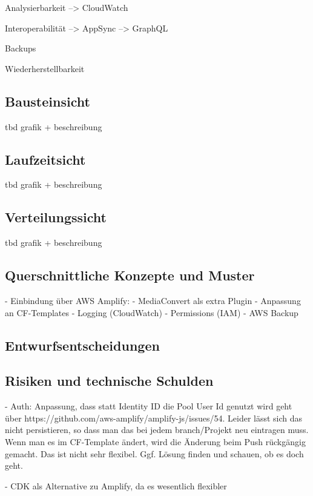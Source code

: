 Analysierbarkeit
--> CloudWatch

Interoperabilität
--> AppSync --> GraphQL

Backups

Wiederherstellbarkeit

\subsection{Bausteinsicht}

tbd grafik + beschreibung

\subsection{Laufzeitsicht}

tbd grafik + beschreibung

\subsection{Verteilungssicht}

tbd grafik + beschreibung

\subsection{Querschnittliche Konzepte und Muster}

- Einbindung über \ac{AWS} Amplify:
  - MediaConvert als extra Plugin
  - Anpassung an CF-Templates
- Logging (CloudWatch)
- Permissions (IAM)
- AWS Backup

\subsection{Entwurfsentscheidungen}

\subsection{Risiken und technische Schulden}

- Auth: Anpassung, dass statt Identity ID die Pool User Id genutzt wird geht über https://github.com/aws-amplify/amplify-js/issues/54. Leider lässt sich das nicht persistieren, so dass man das bei jedem branch/Projekt neu eintragen muss. Wenn man es im CF-Template ändert, wird die Änderung beim Push rückgängig gemacht. Das ist nicht sehr flexibel. Ggf. Lösung finden und schauen, ob es doch geht.

- CDK als Alternative zu Amplify, da es wesentlich flexibler